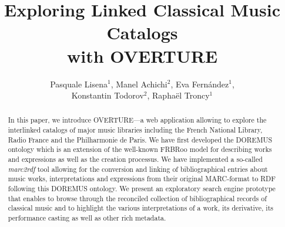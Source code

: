 \documentclass[runningheads,a4paper]{llncs}
\begin{document}
\title{Exploring Linked Classical Music Catalogs\\ with OVERTURE}

\author{Pasquale Lisena$^1$, Manel Achichi$^2$, Eva Fern\'{a}ndez$^1$, \\ Konstantin Todorov$^2$, Rapha\"{e}l Troncy$^1$}

\maketitle


\begin{abstract}
In this paper, we introduce OVERTURE---a web application allowing to explore the interlinked catalogs of major music libraries including the French National Library, Radio France and the Philharmonie de Paris. We have first developed the DOREMUS ontology which is an extension of the well-known FRBRoo model for describing works and expressions as well as the creation processus. We have implemented a so-called {\it marc2rdf} tool allowing for the conversion and linking of bibliographical entries about music works, interpretations and expressions from their original MARC-format to RDF following this DOREMUS ontology. We present an exploratory search engine prototype that enables to browse through the reconciled collection of bibliographical records of classical music and to highlight the various interpretations of a work, its derivative, its performance casting as well as other rich metadata.
\end{abstract}

\end{document}
